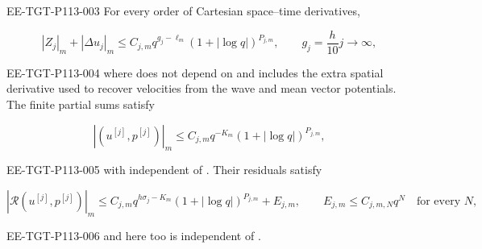 \begin{lemma}\label{lem:9.8}
\begin{EESegment}{EE-TGT-P113-003}
For every order  of Cartesian space--time derivatives,
\end{EESegment}
\begin{equation}
|Z_j|_m+|\Delta u_j|_m
 \le C_{j,m}q^{g_j-\ell_m}(1+|\log q|)^{P_{j,m}},
\qquad
g_j=\frac h{10}j\longrightarrow\infty,
\tag{9.17}\label{eq:9.17}
\end{equation}
\begin{EESegment}{EE-TGT-P113-004}
where  does not depend on  and includes the
extra spatial derivative used to recover velocities from the wave and mean vector potentials. The
finite partial sums satisfy
\end{EESegment}
\[
|(u^{[j]},p^{[j]})|_m
 \le C_{j,m}q^{-K_m}(1+|\log q|)^{P_{j,m}},
\]
\begin{EESegment}{EE-TGT-P113-005}
with  independent of . Their residuals satisfy
\end{EESegment}
\begin{equation}
|\mathscr R(u^{[j]},p^{[j]})|_m
 \le C_{j,m}q^{h\sigma_j-K_m}(1+|\log q|)^{P_{j,m}}+E_{j,m},
\qquad
E_{j,m}\le C_{j,m,N}q^N\quad\text{for every }N,
\tag{9.18}\label{eq:9.18}
\end{equation}
\begin{EESegment}{EE-TGT-P113-006}
and here too  is independent of .
\end{EESegment}
\end{lemma}

